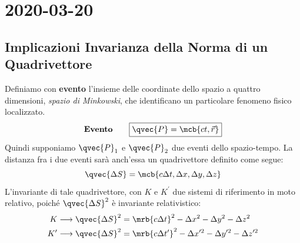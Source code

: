 \chapter{2020-03-20}
\section{Implicazioni Invarianza della Norma di un Quadrivettore}
Definiamo con \textbf{evento} l'insieme delle coordinate dello spazio a quattro
dimensioni, \textit{spazio di Minkowski}, che identificano un particolare
fenomeno fisico localizzato.
\begin{align}
	\textbf{Evento} \qquad \boxed{\qvec{P} = \mcb{ct,\vec{r}}}
\end{align}
Quindi supponiamo $\qvec{P}_1$ e $\qvec{P}_2$ due eventi dello spazio-tempo. La
distanza fra i due eventi sarà anch'essa un quadrivettore definito come segue:
\begin{equation}
	\qvec{\Delta S} = \mcb{c\Delta t, \Delta x, \Delta y, \Delta z}
\end{equation}
L'invariante di tale quadrivettore, con $K$ e $K^\prime$ due sistemi di
riferimento in moto relativo, poiché $\qvec{\Delta S}^2$ è invariante
relativistico:
\begin{align}
	K \longrightarrow \qvec{\Delta S}^2        & = \mrb{c \Delta t}^2 - \Delta x^2 -
	\Delta y^2 - \Delta z^2
	\\
	K^\prime \longrightarrow \qvec{\Delta S}^2 & = \mrb{c \Delta t^\prime}^2 -
	\Delta x^{\prime 2} - \Delta y^{\prime 2} - \Delta z^{\prime 2}
\end{align}

